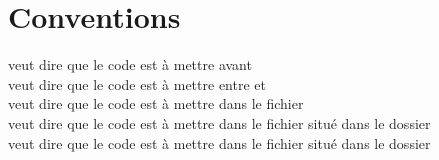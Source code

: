\section{Conventions}

 veut dire que le code est à mettre avant \\
 veut dire que le code est à mettre entre  et \\
 veut dire que le code est à mettre dans le fichier \\
 veut dire que le code est à mettre dans le fichier  situé dans le dossier \\
 veut dire que le code est à mettre dans le fichier  situé dans le dossier \\


